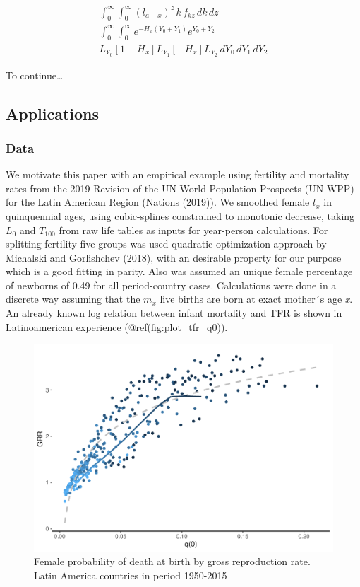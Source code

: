 \documentclass[
]{article}
\begin{document}
\[
\begin{aligned}
\int_{0}^{\infty} \int_{0}^{\infty} {(l_{a-x})^z \, k\, f_{kz} \,dk\,dz}\\
\int_{0}^{\infty} \int_{0}^{\infty}{e^{-H_x(Y_0 + Y_1)}e^{Y_0 + Y_2}}\\
L_{Y_0}[1-H_x]L_{Y_1}[-H_x]L_{Y_2}\,dY_0\,dY_1\,dY_2
\end{aligned}
\]

To continue\ldots{}

\hypertarget{Applications}{%
\subsection{Applications}\label{Applications}}

\hypertarget{Data}{%
\subsubsection{Data}\label{Data}}

We motivate this paper with an empirical example using fertility and
mortality rates from the 2019 Revision of the UN World Population
Prospects (UN WPP) for the Latin American Region (Nations (2019)). We
smoothed female \(l_x\) in quinquennial ages, using cubic-splines
constrained to monotonic decrease, taking \(L_0\) and \(T_{100}\) from
raw life tables as inputs for year-person calculations. For splitting
fertility five groups was used quadratic optimization approach by
Michalski and Gorlishchev (2018), with an desirable property for our
purpose which is a good fitting in parity. Also was assumed an unique
female percentage of newborns of 0.49 for all period-country cases.
Calculations were done in a discrete way assuming that the \(m_x\) live
births are born at exact mother´s age \emph{x}. An already known log
relation between infant mortality and TFR is shown in Latinoamerican
experience (@ref(fig:plot\_tfr\_q0)).

\begin{figure}
\centering
\includegraphics{paper_files/figure-latex/plot_tfr_q0-1.pdf}
\caption{Female probability of death at birth by gross reproduction
rate. Latin America countries in period 1950-2015}
\end{figure}
\end{document}
